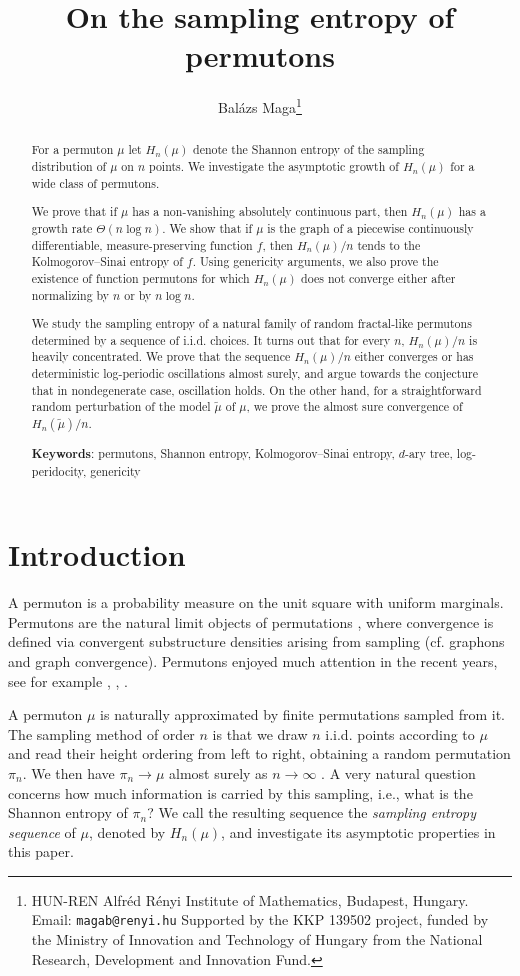 \documentclass[11pt]{article}
\title{On the sampling entropy of permutons}
\author{Bal\'azs Maga\thanks{HUN-REN Alfréd Rényi Institute of Mathematics, Budapest, Hungary. Email: \texttt{magab@renyi.hu} \newline Supported by the KKP 139502 project, funded by the Ministry of Innovation and Technology of Hungary from the National Research, Development and Innovation Fund.}}
\date{}
\theoremstyle{definition}
\begin{document}
\maketitle
\begin{abstract}
For a permuton $\mu$ let $H_n(\mu)$ denote the Shannon entropy of the sampling distribution of $\mu$ on $n$ points. We investigate the asymptotic growth of $H_n(\mu)$ for a wide class of permutons. 

We prove that if $\mu$ has a non-vanishing absolutely continuous part, then $H_n(\mu)$ has a growth rate $\Theta(n \log n)$. We show that if $\mu$ is the graph of a piecewise continuously differentiable, measure-preserving function $f$, then $H_n(\mu)/n$ tends to the Kolmogorov--Sinai entropy of $f$. Using genericity arguments, we also prove the existence of function permutons for which $H_n(\mu)$ does not converge either after normalizing by $n$ or by $n\log n$.

We study the sampling entropy of a natural family of random fractal-like permutons determined by a sequence of i.i.d. choices. It turns out that for every $n$, $H_n(\mu)/n$ is heavily concentrated. We prove that the sequence $H_n(\mu)/n$ either converges or has deterministic log-periodic oscillations almost surely, and argue towards the conjecture that in nondegenerate case, oscillation holds. On the other hand, for a straightforward random perturbation of the model $\tilde{\mu}$ of $\mu$, we prove the almost sure convergence of $H_n(\tilde{\mu})/n$.

\medskip

\noindent \textbf{Keywords}: permutons, Shannon entropy, Kolmogorov--Sinai entropy, $d$-ary tree, log-peridocity, genericity
\end{abstract}


\section{Introduction}

A permuton is a probability measure on the unit square with uniform marginals. Permutons are the natural limit objects of permutations \cite{HOPPEN201393}, where convergence is defined via convergent substructure densities arising from sampling (cf. graphons and graph convergence). Permutons enjoyed much attention in the recent years, see for example \cite{ALON2022102361}, \cite{BASSINO2022108513}, \cite{GLEBOV2015112}.

A permuton $\mu$ is naturally approximated by finite permutations sampled from it. The sampling method of order $n$ is that we draw $n$ i.i.d. points according to $\mu$ and read their height ordering from left to right, obtaining a random permutation $\pi_n$. We then have  $\pi_n\to\mu$ almost surely as $n\to\infty$ \cite[Lemma~4.2]{HOPPEN201393}. A very natural question concerns how much information is carried by this sampling, i.e., what is the Shannon entropy of $\pi_n$? We call the resulting sequence the {\it sampling entropy sequence} of $\mu$, denoted by $H_n(\mu)$, and investigate its asymptotic properties in this paper.
\end{document}
